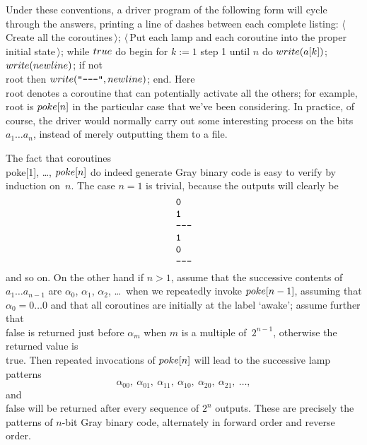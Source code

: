 Under these conventions, a driver program of the following form
will cycle through the answers,
printing a line of dashes between each complete listing:
\beginprogram
\rm$\langle\,$Create all the coroutines$\,\rangle$;\cr
\rm$\langle\,$Put each lamp and each coroutine into the proper initial
 state$\,\rangle$;\cr
while $\\{true}$ do begin\cr
 \quad for $k:=1$ step 1 until $n$ do $\\{write}
(a[k])$;\cr
 \quad $\\{write}(\\{newline})$;\cr 
 \quad if not \\{root} then
$\\{write}(\hbox{\tt"-----"}, \\{newline})$;\cr
\quad end\rm.\cr
\endprogram
Here \\{root} denotes a coroutine that can potentially activate all the
others; for example, \\{root} is $\\{poke}[n]$ in the particular case
that we've been considering.
In practice, of course, the driver would normally carry out
some interesting process on the bits $a_1\ldots a_n$,
instead of merely outputting them to a file.

The fact that coroutines \\{poke}[1], \dots, $\\{poke}[n]$ do indeed generate
Gray binary code is easy to verify by induction on~$n$. The case $n=1$ is
trivial, because the outputs will clearly be
$$\vcenter{\halign{\tt#\cr
0\cr
1\cr
-----\cr
1\cr
0\cr
-----\cr}}$$
and so on. On the other hand
if $n>1$, assume that the successive contents of $a_1\ldots
a_{n-1}$ are $\alpha_0$, $\alpha_1$, $\alpha_2$, \dots\ when we repeatedly
invoke $\\{poke}[n-1]$, assuming that $\alpha_0=0\ldots0$ and that all
coroutines are initially at the label `awake'; assume further that \\{false}
is returned just before $\alpha_m$ when $m$ is a multiple of~$2^{n-1}$,
otherwise the returned value is~\\{true}. Then repeated invocations of
$\\{poke}[n]$ will lead to the successive lamp patterns
$$\alpha_00,\ \alpha_01,\ \alpha_11,\ \alpha_10,\ \alpha_20,\ \alpha_21,\
\ldots,$$
and \\{false} will be returned after every sequence of $2^n$ outputs.
These are precisely the
patterns of $n$-bit Gray binary code, alternately in forward order and
reverse order.


